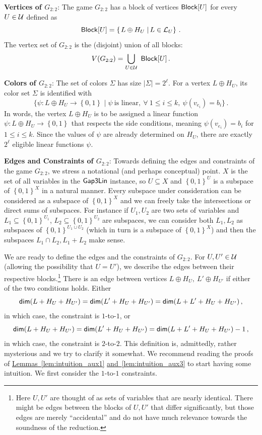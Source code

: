 \documentclass[11pt]{article}
\numberwithin{equation}{section}
\theoremstyle{definition}
\theoremstyle{plain}
\newcommand{\expref}[2]{\hyperref[#2]{#1~\ref{#2}}}
\newcommand\sett[2]{\left\{ \left. #1 \;\right\vert #2 \right\}}
\newcommand\set[1]{{\left\{ #1 \right\}}}
\newcommand\power[1]{\set{0,1}^{#1}}
\newcommand*\xor{\mathbin{\oplus}}
\renewcommand\leq{\leqslant}
\begin{document}
\medskip
\noindent \textbf{Vertices of $G_{2:2}$}: The game $G_{2:2}$ has a block of vertices ${\sf Block}[U]$ for every $U \in {\cal U}$ defined as
  $${\sf Block}[U] = \sett{L\xor H_U}{ L\in{\cal L}_U}\,.$$%
The vertex set of $G_{2:2}$ is the (disjoint) union of all blocks:
\[
V(G_{2:2})=  \bigcup_{U \in {\cal U}}  ~{\sf Block}[U]\,.%
\]

\medskip
\noindent \textbf{Colors of  $G_{2:2}$}: The set of colors $\Sigma$ has size $|\Sigma|=2^\ell$. For a vertex $L\xor H_U$, its color
set $\Sigma$ is identified with  
 $$ \{ \psi: L \xor H_U \to \power{} \mid \psi ~\mbox{is linear}, \ \forall ~1\leq i \leq k, ~\psi(v_{e_i})=b_i  \}\,.$$%
 In words, the
 vertex $L\xor H_U$ is  to be assigned a linear function $\psi: L \xor H_U \to \power{}$
that respects the side conditions, meaning $\psi(v_{e_i}) = b_i$ for $1 \leq i \leq k$. Since the values of $\psi$ are already determined
on $H_U$, there are exactly $2^\ell$ eligible linear functions $\psi$.




\medskip
\noindent \textbf{Edges and Constraints of $G_{2:2}$}: Towards defining the edges and constraints of the game $G_{2:2}$, we stress
a notational (and perhaps conceptual) point.  $X$ is the set of all variables in the ${\sf Gap3Lin}$ instance, so $U \subseteq X$ and
 $\power{U}$ is a subspace of
$\power{X}$ in a natural manner. Every subspace under consideration can be considered as a subspace of $\power{X}$ and we can freely
take the intersections or direct sums of subspaces. For instance
 if $U_1,U_2$ are two sets of variables and $L_1\subseteq \power{U_1}$,
 $L_2\subseteq \power{U_2}$ are subspaces, we can consider both $L_1, L_2$ as subspaces of $\power{U_1 \cup U_2}$ (which in turn is
 a subspace of $\power{X}$) and then the subspaces $L_1\cap L_2, L_1+ L_2$ make sense.

\smallskip We are ready to define the edges and the constraints of $G_{2:2}$. For $U, U' \in {\cal U}$ (allowing the possibility that $U=U'$), we describe the edges
between their respective blocks.\footnote{Here $U, U'$ are thought of as sets of variables that are nearly identical. There might be
edges between the blocks of $U, U'$ that differ significantly, but those edges are merely ``accidental'' and do not have much relevance
towards the soundness of the reduction.}
There is an edge between vertices $L\xor H_U, ~L'\xor H_{U'}$ if either of the two conditions holds. Either
\begin{equation}\label{eqn:1-to-1}
{\sf dim} (L + H_U + H_{U'}) = {\sf dim} (L' + H_U + H_{U'}) = {\sf dim} (L + L' + H_U + H_{U'})\,,%
\end{equation}
in which case, the constraint is $1$-to-$1$, or
\begin{equation}
 {\sf dim} (L + H_U + H_{U'}) ={\sf dim} (L' + H_U + H_{U'}) = {\sf dim} (L + L' + H_U + H_{U'}) - 1\,,%
\end{equation}
in which case, the constraint is $2$-to-$2$. This definition is, admittedly, rather mysterious and we try to clarify it somewhat. We recommend reading the proofs of \expref{Lemmas}{lem:intuition_aux1} \expref{and}{lem:intuition_aux3} %
to start having some intuition. We first consider the $1$-to-$1$ constraints.
\end{document}
